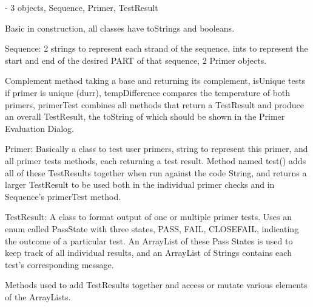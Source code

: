 - 3 objects, Sequence, Primer, TestResult

Basic in construction, all classes have toStrings and booleans.

Sequence:
2 strings to represent each strand of the sequence, ints to represent the start and end of the desired PART of that sequence, 2 Primer objects.

Complement method taking a base and returning its complement, isUnique tests if primer is unique (durr), tempDifference compares the temperature
of both primers, primerTest combines all methods that return a TestResult and produce an overall TestResult, the toString of which should be
shown in the Primer Evaluation Dialog.

Primer:
Basically a class to test user primers, string to represent this primer, and all primer tests methods, each returning a test result. Method named
test() adds all of these TestResults together when run against the code String, and returns a larger TestResult to be used both in the individual 
primer checks and in Sequence's primerTest method.

TestResult:
A class to format output of one or multiple primer tests. Uses an enum called PassState with three states, PASS, FAIL, CLOSEFAIL, indicating
the outcome of a particular test. An ArrayList of these Pass States is used to keep track of all individual results, and an ArrayList of Strings
contains each test's corresponding message.

Methods used to add TestResults together and access or mutate various elements of the ArrayLists.